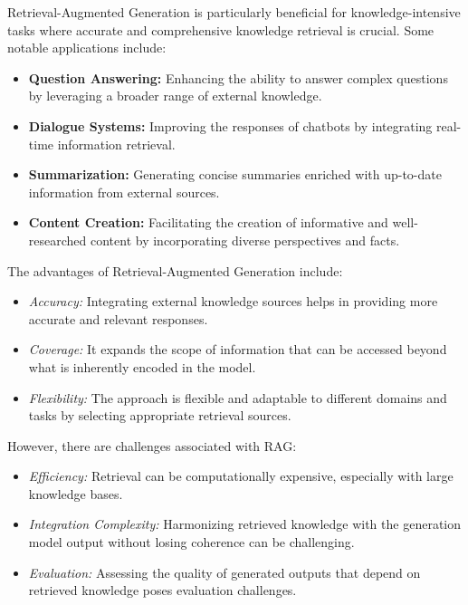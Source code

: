 \newpage

Retrieval-Augmented Generation is particularly beneficial for knowledge-intensive tasks where accurate and comprehensive knowledge retrieval is crucial. Some notable applications include:



\begin{itemize}
    \item \textbf{Question Answering:} Enhancing the ability to answer complex questions by leveraging a broader range of external knowledge.
    \item \textbf{Dialogue Systems:} Improving the responses of chatbots by integrating real-time information retrieval.
    \item \textbf{Summarization:} Generating concise summaries enriched with up-to-date information from external sources.
    \item \textbf{Content Creation:} Facilitating the creation of informative and well-researched content by incorporating diverse perspectives and facts.
\end{itemize}


\hfill \break
The advantages of Retrieval-Augmented Generation include:
\begin{itemize}
    \item \textit{Accuracy:} Integrating external knowledge sources helps in providing more accurate and relevant responses.
    \item \textit{Coverage:} It expands the scope of information that can be accessed beyond what is inherently encoded in the model.
    \item \textit{Flexibility:} The approach is flexible and adaptable to different domains and tasks by selecting appropriate retrieval sources.
\end{itemize}

\newpage
\hfill \break
However, there are challenges associated with RAG:
\begin{itemize}
    \item \textit{Efficiency:} Retrieval can be computationally expensive, especially with large knowledge bases.
    \item \textit{Integration Complexity:} Harmonizing retrieved knowledge with the generation model output without losing coherence can be challenging.
    \item \textit{Evaluation:} Assessing the quality of generated outputs that depend on retrieved knowledge poses evaluation challenges.
\end{itemize}

